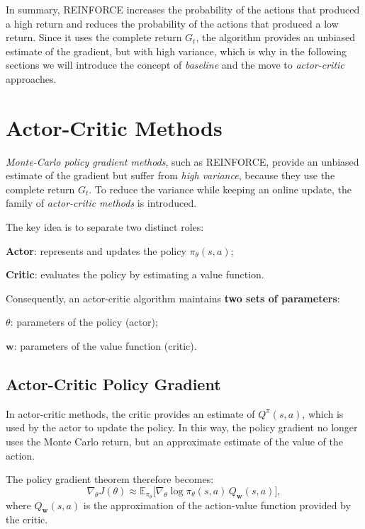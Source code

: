 In summary, REINFORCE increases the probability of the actions that produced a high return and reduces the probability of the actions that produced a low return. Since it uses the complete return $G_t$, the algorithm provides an unbiased estimate of the gradient, but with high variance, which is why in the following sections we will introduce the concept of \emph{baseline} and the move to \emph{actor-critic} approaches.

\section{Actor-Critic Methods}

\emph{Monte-Carlo policy gradient methods}, such as REINFORCE, provide an unbiased estimate of the gradient but suffer from \emph{high variance}, because they use the complete return $G_t$. To reduce the variance while keeping an online update, the family of \emph{actor-critic methods} is introduced.

The key idea is to separate two distinct roles:
\begin{compactitemize}
    \item \textbf{Actor}: represents and updates the policy $\pi_\theta(s,a)$;
    \item \textbf{Critic}: evaluates the policy by estimating a value function.
\end{compactitemize}

Consequently, an actor-critic algorithm maintains \textbf{two sets of parameters}:
\begin{compactitemize}
    \item $\theta$: parameters of the policy (actor);
    \item $\mathbf{w}$: parameters of the value function (critic).
\end{compactitemize}

\subsection{Actor-Critic Policy Gradient}

In actor-critic methods, the critic provides an estimate of $Q^\pi(s,a)$, which is used by the actor to update the policy. In this way, the policy gradient no longer uses the Monte Carlo return, but an approximate estimate of the value of the action.

The policy gradient theorem therefore becomes:
\[
\nabla_\theta J(\theta)
\approx
\mathbb{E}_{\pi_\theta}
\big[
\nabla_\theta \log \pi_\theta(s,a)\, Q_{\mathbf{w}}(s,a)
\big],
\]
where $Q_{\mathbf{w}}(s,a)$ is the approximation of the action-value function provided by the critic.

